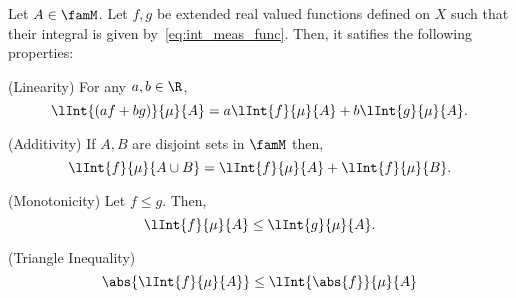 \begin{Proposition}[name=Properties of the integral of non-negative measurable function]
    Let $A \in \famM$. Let $f,g$ be extended real valued functions defined on $X$ 
    such that their integral is given
    by~\ref{eq:int_meas_func}. Then, it satifies the following properties:
    \begin{properties}
    \item
	(Linearity) For any $a,b \in \R$, 
	\[\lInt{(af + bg)}{\mu}{A} = a\lInt{f}{\mu}{A} + b\lInt{g}{\mu}{A}.\]
    \item
	(Additivity) If $A,B$ are disjoint sets in $\famM$ then,
	\[\lInt{f}{\mu}{A\cup B} = \lInt{f}{\mu}{A} + \lInt{f}{\mu}{B}.\]
    \item
	(Monotonicity) Let $f\leq g$. Then,
	\[\lInt{f}{\mu}{A} \leq \lInt{g}{\mu}{A}.\]
    \item
	(Triangle Inequality)
	\[\abs{\lInt{f}{\mu}{A}} \leq \lInt{\abs{f}}{\mu}{A}\]
    \end{properties}
\end{Proposition}
